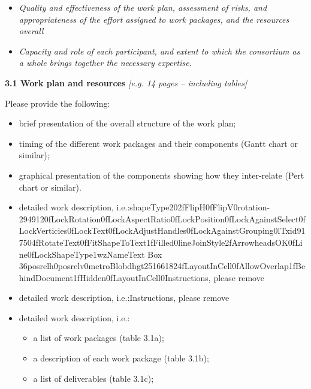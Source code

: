 \begin{itemize}
\item
  \emph{Quality and effectiveness of the work plan, assessment of risks,
  and appropriateness of the effort assigned to work packages, and the
  resources overall}
\item
  \emph{Capacity and role of each participant, and extent to which the
  consortium as a whole brings together the necessary expertise.}
\end{itemize}

\textbf{3.1 Work plan and resources }\emph{{[}e.g. 14 pages -- including
tables{]}}

Please provide the following:

\begin{itemize}
\item
  brief presentation of the overall structure of the work plan;
\item
  timing of the different work packages and their components (Gantt
  chart or similar);
\item
  graphical presentation of the components showing how they inter-relate
  (Pert chart or similar).
\item
  detailed work description,
  i.e.:shapeType202fFlipH0fFlipV0rotation-2949120fLockRotation0fLockAspectRatio0fLockPosition0fLockAgainstSelect0fLockVerticies0fLockText0fLockAdjustHandles0fLockAgainstGrouping0lTxid917504fRotateText0fFitShapeToText1fFilled0lineJoinStyle2fArrowheadsOK0fLine0fLockShapeType1wzNameText
  Box
  36posrelh0posrelv0metroBlobdhgt251661824fLayoutInCell0fAllowOverlap1fBehindDocument1fHidden0fLayoutInCell0Instructions,
  please remove
\item
  detailed work description, i.e.:Instructions, please remove
\item
  detailed work description, i.e.:

  \begin{itemize}
  \item
    a list of work packages (table 3.1a);
  \item
    a description of each work package (table 3.1b);
  \item
    a list of deliverables (table 3.1c);
  \end{itemize}
\end{itemize}

